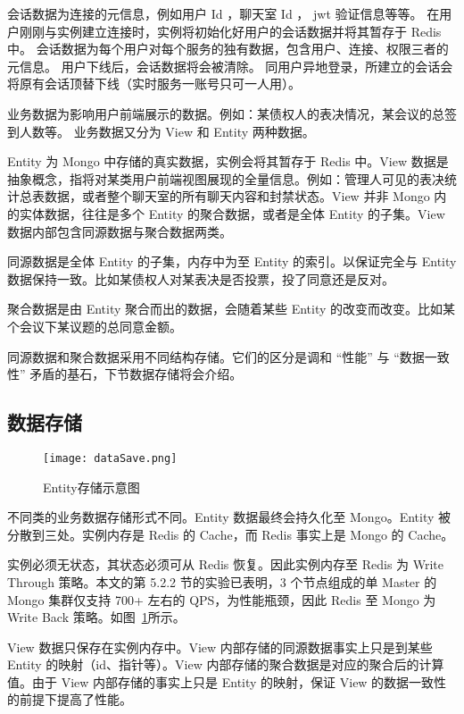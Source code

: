 会话数据为连接的元信息，例如用户 Id ，聊天室 Id ， jwt 验证信息等等。
在用户刚刚与实例建立连接时，实例将初始化好用户的会话数据并将其暂存于 Redis 中。
会话数据为每个用户对每个服务的独有数据，包含用户、连接、权限三者的元信息。
用户下线后，会话数据将会被清除。
同用户异地登录，所建立的会话会将原有会话顶替下线（实时服务一账号只可一人用）。

业务数据为影响用户前端展示的数据。例如：某债权人的表决情况，某会议的总签到人数等。
业务数据又分为 View 和 Entity 两种数据。

Entity 为 Mongo 中存储的真实数据，实例会将其暂存于 Redis 中。View 数据是抽象概念，指将对某类用户前端视图展现的全量信息。例如：管理人可见的表决统计总表数据，或者整个聊天室的所有聊天内容和封禁状态。View 并非 Mongo 内的实体数据，往往是多个 Entity 的聚合数据，或者是全体 Entity 的子集。View 数据内部包含同源数据与聚合数据两类。

同源数据是全体 Entity 的子集，内存中为至 Entity 的索引。以保证完全与 Entity 数据保持一致。比如某债权人对某表决是否投票，投了同意还是反对。

聚合数据是由 Entity 聚合而出的数据，会随着某些 Entity 的改变而改变。比如某个会议下某议题的总同意金额。

同源数据和聚合数据采用不同结构存储。它们的区分是调和 “性能” 与 “数据一致性” 矛盾的基石，下节数据存储将会介绍。

\subsection{数据存储}

\begin{figure}[!htp]
  \centering
  \texttt{[image: dataSave.png]}
  \caption[Entity存储示意]
    {Entity存储示意图}
 \label{fig:dataSave}
\end{figure}

不同类的业务数据存储形式不同。Entity 数据最终会持久化至 Mongo。Entity 被分散到三处。实例内存是 Redis 的 Cache，而 Redis 事实上是 Mongo 的 Cache。

实例必须无状态，其状态必须可从 Redis 恢复。因此实例内存至 Redis 为 Write Through 策略。本文的第 5.2.2 节的实验已表明，3 个节点组成的单 Master 的 Mongo 集群仅支持 700+ 左右的 QPS，为性能瓶颈，因此 Redis 至 Mongo 为 Write Back 策略。如图~\ref{fig:dataSave}所示。

View 数据只保存在实例内存中。View 内部存储的同源数据事实上只是到某些 Entity 的映射（id、指针等）。View 内部存储的聚合数据是对应的聚合后的计算值。由于 View 内部存储的事实上只是 Entity 的映射，保证 View 的数据一致性的前提下提高了性能。

